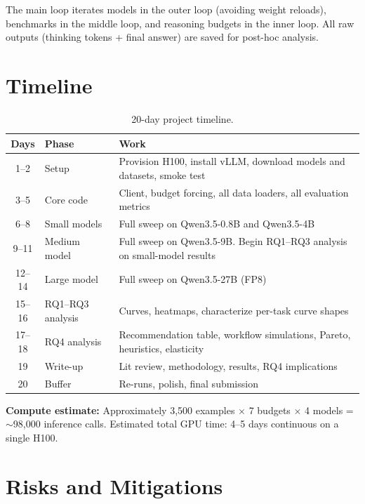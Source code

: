 \documentclass[11pt]{article}
\begin{document}
The main loop iterates models in the outer loop (avoiding weight reloads), benchmarks in the middle loop, and reasoning budgets in the inner loop. All raw outputs (thinking tokens + final answer) are saved for post-hoc analysis.

\section{Timeline}

\begin{table}[h]
\centering
\caption{20-day project timeline.}
\label{tab:timeline}
\begin{tabular}{@{}clp{9cm}@{}}
\toprule
\textbf{Days} & \textbf{Phase} & \textbf{Work} \\
\midrule
1--2 & Setup & Provision H100, install vLLM, download models and datasets, smoke test \\
3--5 & Core code & Client, budget forcing, all data loaders, all evaluation metrics \\
6--8 & Small models & Full sweep on Qwen3.5-0.8B and Qwen3.5-4B \\
9--11 & Medium model & Full sweep on Qwen3.5-9B. Begin RQ1--RQ3 analysis on small-model results \\
12--14 & Large model & Full sweep on Qwen3.5-27B (FP8) \\
15--16 & RQ1--RQ3 analysis & Curves, heatmaps, characterize per-task curve shapes \\
17--18 & RQ4 analysis & Recommendation table, workflow simulations, Pareto, heuristics, elasticity \\
19 & Write-up & Lit review, methodology, results, RQ4 implications \\
20 & Buffer & Re-runs, polish, final submission \\
\bottomrule
\end{tabular}
\end{table}

\textbf{Compute estimate:} Approximately 3,500 examples $\times$ 7 budgets $\times$ 4 models = $\sim$98,000 inference calls. Estimated total GPU time: 4--5 days continuous on a single H100.

\section{Risks and Mitigations}
\end{document}
